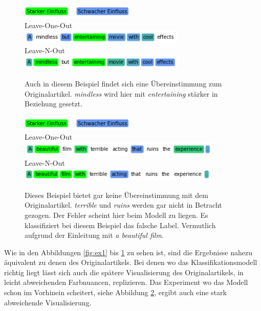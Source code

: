 \documentclass[DIV=13,fontsize=11pt]{scrartcl}
\begin{document}
\begin{figure}[H]
    \centering
    \includegraphics[]{img/legend.png}\\
    Leave-One-Out\\
    \includegraphics[]{img/third_ex_loo.png}\\
    Leave-N-Out\\
    \includegraphics[]{img/third_ex_lno.png}
    \caption{Auch in diesem Beispiel findet sich eine Übereinstimmung zum Originalartikel. \textit{mindless} wird hier mit \textit{entertaining} stärker in Beziehung gesetzt.}
    \label{fig:ex3}
\end{figure}

\begin{figure}[H]
    \centering
    \includegraphics[]{img/legend.png}\\
    Leave-One-Out\\
    \includegraphics[]{img/fourth_ex_loo.png}\\
    Leave-N-Out\\
    \includegraphics[]{img/fourth_ex_lno.png}
    \caption{Dieses Beispiel bietet gar keine Übereinstimmung mit dem Originalartikel. \textit{terrible} und \textit{ruins} werden gar nicht in Betracht gezogen. Der Fehler scheint hier beim Modell zu liegen. Es klassifiziert bei diesem Beispiel das falsche Label. Vermutlich aufgrund der Einleitung mit \textit{a beautiful film}.}
    \label{fig:ex4}
\end{figure}

Wie in den Abbildungen \ref{fig:ex1} bis \ref{fig:ex3} zu sehen ist, sind die Ergebnisse nahezu äquivalent zu denen des
Originalartikels. Bei denen wo das Klassifikationsmodell richtig liegt lässt sich auch die
spätere Visualisierung des Originalartikels, in leicht abweichenden Farbnuancen, replizieren.
Das Experiment wo das Modell schon im Vorhinein scheitert, siehe Abbildung \ref{fig:ex4}, ergibt auch eine stark abweichende Visualisierung.
\end{document}
